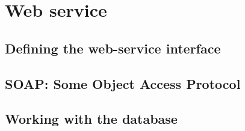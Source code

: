 
\section{Web service}
\label{web_service}

\subsection{Defining the web-service interface}

\subsection{SOAP: Some Object Access Protocol}

\subsection{Working with the database}

